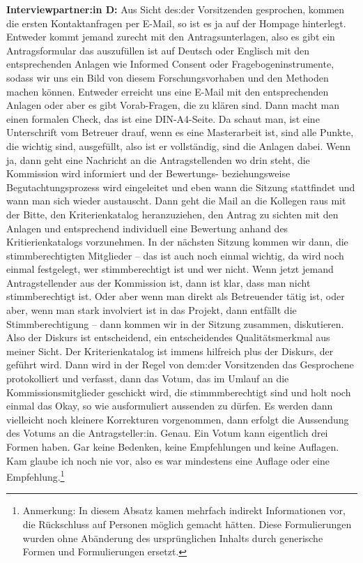 \documentclass[a4paper,12pt,twoside,numbers=noendperiod]{scrreprt}
\begin{document}
\textbf{Interviewpartner:in D:} Aus Sicht des:der Vorsitzenden gesprochen, kommen die ersten Kontaktanfragen per E-Mail, so ist es ja auf der Hompage hinterlegt. Entweder kommt jemand zurecht mit den Antragsunterlagen, also es gibt ein Antragsformular das auszufüllen ist auf Deutsch oder Englisch mit den entsprechenden Anlagen wie Informed Consent oder Fragebogeninstrumente, sodass wir uns ein Bild von diesem Forschungsvorhaben und den Methoden machen können. Entweder erreicht uns eine E-Mail mit den entsprechenden Anlagen oder aber es gibt Vorab-Fragen, die zu klären sind. Dann macht man einen formalen Check, das ist eine DIN-A4-Seite. Da schaut man, ist eine Unterschrift vom Betreuer drauf, wenn es eine Masterarbeit ist, sind alle Punkte, die wichtig sind, ausgefüllt, also ist er vollständig, sind die Anlagen dabei. Wenn ja, dann geht eine Nachricht an die Antragstellenden wo drin steht, die Kommission wird informiert und der Bewertungs- beziehungsweise Begutachtungsprozess wird eingeleitet und eben wann die Sitzung stattfindet und wann man sich wieder austauscht. Dann geht die Mail an die Kollegen raus mit der Bitte, den Kriterienkatalog heranzuziehen, den Antrag zu sichten mit den Anlagen und entsprechend individuell eine Bewertung anhand des Kritierienkatalogs vorzunehmen. In der nächsten Sitzung kommen wir dann, die stimmberechtigten Mitglieder -- das ist auch noch einmal wichtig, da wird noch einmal festgelegt, wer stimmberechtigt ist und wer nicht. Wenn jetzt jemand Antragstellender aus der Kommission ist, dann ist klar, dass man nicht stimmberechtigt ist. Oder aber wenn man direkt als Betreuender tätig ist, oder aber, wenn man stark involviert ist in das Projekt, dann entfällt die Stimmberechtigung -- dann kommen wir in der Sitzung zusammen, diskutieren. Also der Diskurs ist entscheidend, ein entscheidendes Qualitätsmerkmal aus meiner Sicht. Der Kriterienkatalog ist immens hilfreich plus der Diskurs, der geführt wird. Dann wird in der Regel von dem:der Vorsitzenden das Gesprochene protokolliert und verfasst, dann das Votum, das im Umlauf an die Kommissionsmitglieder geschickt wird, die stimmmberechtigt sind und holt noch einmal das Okay, so wie ausformuliert aussenden zu dürfen. Es werden dann vielleicht noch kleinere Korrekturen vorgenommen, dann erfolgt die Aussendung des Votums an die Antragsteller:in. Genau. Ein Votum kann eigentlich drei Formen haben. Gar keine Bedenken, keine Empfehlungen und keine Auflagen. Kam glaube ich noch nie vor, also es war mindestens eine Auflage oder eine Empfehlung.\footnote{Anmerkung: In diesem Absatz kamen mehrfach indirekt Informationen vor, die Rückschluss auf Personen möglich gemacht hätten. Diese Formulierungen wurden ohne Abänderung des ursprünglichen Inhalts durch generische Formen und Formulierungen ersetzt.}
\end{document}
